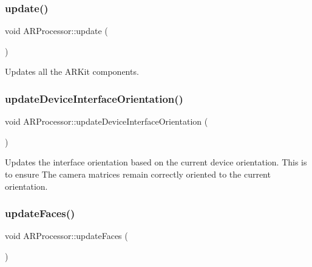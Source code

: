 \subsubsection{\texorpdfstring{update()}{update()}}
{\footnotesize\ttfamily void A\+R\+Processor\+::update (\begin{DoxyParamCaption}{ }\end{DoxyParamCaption})}



Updates all the A\+R\+Kit components. 

\mbox{\label{class_a_r_processor_a48797c1a249b2f115d0151396bc1eb9c}} 
\subsubsection{\texorpdfstring{update\+Device\+Interface\+Orientation()}{updateDeviceInterfaceOrientation()}}
{\footnotesize\ttfamily void A\+R\+Processor\+::update\+Device\+Interface\+Orientation (\begin{DoxyParamCaption}{ }\end{DoxyParamCaption})}

Updates the interface orientation based on the current device orientation. This is to ensure The camera matrices remain correctly oriented to the current orientation. \mbox{\label{class_a_r_processor_a53dbd6040f277ee7f7ef08f79240cdfb}} 
\subsubsection{\texorpdfstring{update\+Faces()}{updateFaces()}}
{\footnotesize\ttfamily void A\+R\+Processor\+::update\+Faces (\begin{DoxyParamCaption}{ }\end{DoxyParamCaption})}

\mbox{\label{class_a_r_processor_aaa1488d9082ec598fd4aeb5c5c43d999}} 
